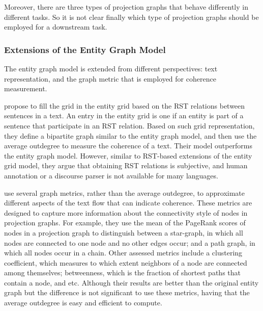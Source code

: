 Moreover, there are three types of projection graphs that behave differently in different tasks. 
So it is not clear finally which type of projection graphs should be employed for a downstream task. 

\subsubsection{Extensions of the Entity Graph Model}

The entity graph model is extended from different perspectives: text representation, and the graph metric that is employed for coherence measurement. 

 propose to fill the grid in the entity grid based on the RST relations between sentences in a text. 
An entry in the entity grid is one if an entity is part of a sentence that participate in an RST relation.
Based on such grid representation, they define a bipartite graph similar to the entity graph model, and then use the average outdegree to measure the coherence of a text. 
Their model outperforms the entity graph model. 
However, similar to RST-based extensions of the entity grid model, they argue that obtaining RST relations is subjective, and human annotation or a discourse parser is not available for many languages. 

 use several graph metrics, rather than the average outdegree, to approximate different aspects of the text flow that can indicate coherence.  
These metrics are designed to capture more information about the connectivity style of nodes in projection graphs. 
For example, they use the mean of the PageRank scores \cite{newmanmark10}  of nodes in a projection graph to distinguish between a star-graph, in which all nodes are connected to one node and no other edges occur; and a path graph, in which all nodes occur in a chain. 
Other assessed metrics include a clustering coefficient, which measures to which extent neighbors of a node are connected among themselves; betweenness, which is the fraction of shortest paths that contain a node, and etc. 
Although their results are better than the original entity graph but the difference is not significant to use these metrics, having that the average outdegree is easy and efficient to compute. 


